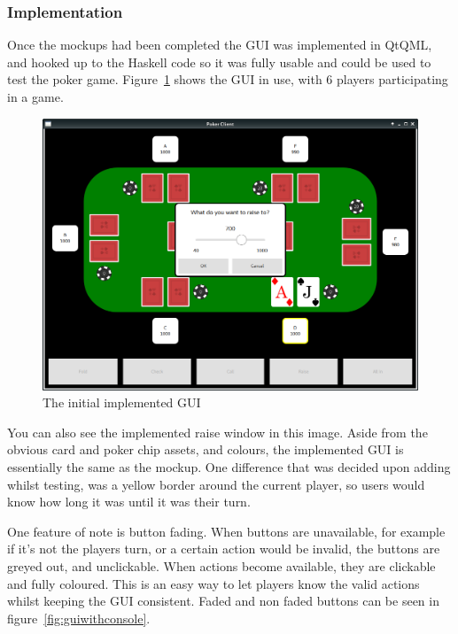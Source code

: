 \subsubsection{Implementation}\label{section:uiimplementation}

Once the mockups had been completed the GUI was implemented in QtQML,
and hooked up to the Haskell code so it was fully usable and could be used
to test the poker game. Figure~\ref{fig:actualgui} shows the GUI in use,
with 6 players participating in a game. 

\begin{figure}[H]
    \centering
    \includegraphics[width=\textwidth]{../images/actualgui.png}
    \caption{The initial implemented GUI}%
    \label{fig:actualgui}
\end{figure}

You can also see the implemented raise window in this image. Aside from the 
obvious card and poker chip assets, and colours, the implemented GUI is 
essentially the same as the mockup. One difference that was decided upon 
adding whilst testing, was a yellow border around the current player, so users 
would know how long it was until it was their turn. 

One feature of note is button fading. When buttons are unavailable, for
example if it's not the players turn, or a certain action would be invalid,
the buttons are greyed out, and unclickable. When actions become available,
they are clickable and fully coloured. This is an easy way to let players
know the valid actions whilst keeping the GUI consistent. Faded and non faded
buttons can be seen in figure~\ref{fig:guiwithconsole}.

